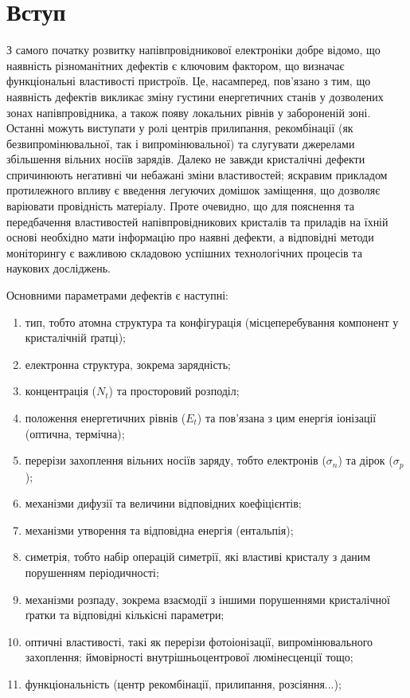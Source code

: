 \chapter*{Вступ}\label{chap0}

З самого початку розвитку напівпровідникової електроніки добре відомо, що наявність
різноманітних дефектів є ключовим фактором, що визначає функціональні властивості пристроїв.
Це, насамперед, пов'язано з тим, що наявність дефектів викликає зміну густини енергетичних станів
у дозволених зонах напівпровідника, а також
появу локальних рівнів у забороненій зоні.
Останні можуть виступати у ролі центрів прилипання, рекомбінації (як безвипромінювальної, так і випромінювальної) та
слугувати джерелами збільшення вільних носіїв зарядів.
Далеко не завжди кристалічні дефекти спричинюють негативні чи небажані зміни властивостей;
яскравим прикладом протилежного впливу є введення легуючих домішок заміщення, що дозволяє варіювати
провідність матеріалу.
Проте очевидно, що для пояснення та передбачення властивостей напівпровідникових кристалів та приладів
на їхній основі необхідно мати інформацію про наявні дефекти, а відповідні методи
моніторингу є важливою складовою успішних технологічних процесів та наукових досліджень.

Основними параметрами дефектів є наступні:
\begin{enumerate}[label=\arabic*),leftmargin=0em,itemindent=1.5em]
\item тип, тобто атомна структура та конфігурація (місцеперебування компонент у кристалічній ґратці);
\item електронна структура, зокрема зарядність;
\item концентрація ($N_t$) та просторовий розподіл;
\item положення енергетичних рівнів ($E_t$) та пов'язана з цим енергія іонізації (оптична, термічна);
\item перерізи захоплення вільних носіїв заряду, тобто електронів ($\sigma_n$) та дірок ($\sigma_p$);
\item механізми дифузії та величини відповідних коефіцієнтів;
\item механізми утворення та відповідна енергія (ентальпія);
\item симетрія, тобто набір операцій симетрії, які властиві кристалу з даним порушенням періодичності;
\item механізми розпаду, зокрема взаємодії з іншими порушеннями кристалічної ґратки та відповідні кількісні параметри;
\item оптичні властивості, такі як перерізи фотоіонізації, випромінювального захоплення;
ймовірності внутрішньоцентрової люмінесценції тощо;
\item функціональність (центр рекомбінації, прилипання, розсіяння...);
\end{enumerate}

